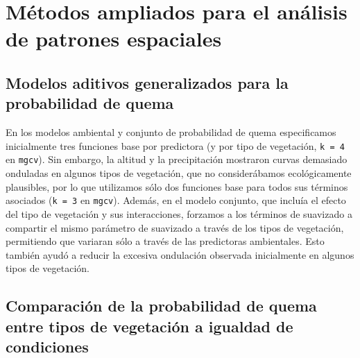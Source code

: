 \FloatBarrier

\section{Métodos ampliados para el análisis de patrones espaciales}

\subsection{Modelos aditivos generalizados para la probabilidad de quema}\label{append:gams}

En los modelos ambiental y conjunto de probabilidad de quema especificamos inicialmente tres funciones base por predictora (y por tipo de vegetación, \texttt{k = 4} en \texttt{mgcv}). Sin embargo, la altitud y la precipitación mostraron curvas demasiado onduladas en algunos tipos de vegetación, que no considerábamos ecológicamente plausibles, por lo que utilizamos sólo dos funciones base para todos sus términos asociados (\texttt{k = 3} en \texttt{mgcv}). Además, en el modelo conjunto, que incluía el efecto del tipo de vegetación y sus interacciones, forzamos a los términos de suavizado a compartir el mismo parámetro de suavizado a través de los tipos de vegetación, permitiendo que variaran sólo a través de las predictoras ambientales. Esto también ayudó a reducir la excesiva ondulación observada inicialmente en algunos tipos de vegetación.

\subsection{Comparación de la probabilidad de quema entre tipos de vegetación a igualdad de condiciones}\label{append:veg-comparison}

